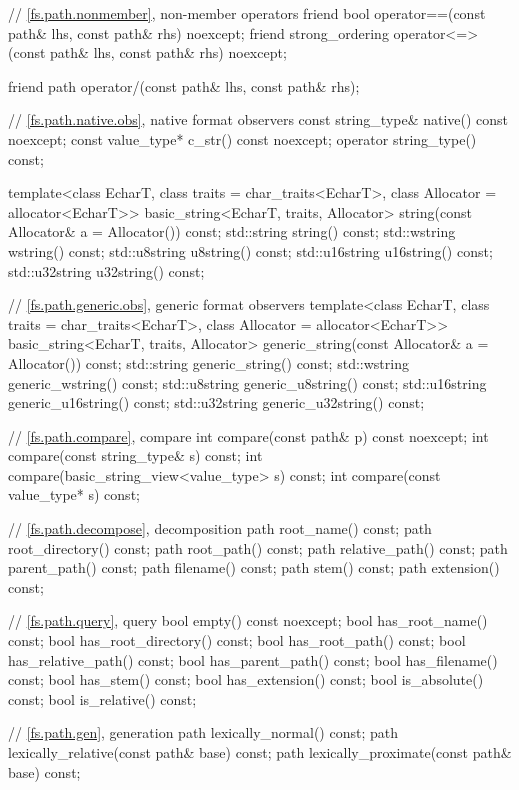 \begin{codeblock}
{{    // \ref{fs.path.nonmember}, non-member operators
    friend bool operator==(const path& lhs, const path& rhs) noexcept;
    friend strong_ordering operator<=>(const path& lhs, const path& rhs) noexcept;

    friend path operator/(const path& lhs, const path& rhs);

    // \ref{fs.path.native.obs}, native format observers
    const string_type& native() const noexcept;
    const value_type*  c_str() const noexcept;
    operator string_type() const;

    template<class EcharT, class traits = char_traits<EcharT>,
             class Allocator = allocator<EcharT>>
      basic_string<EcharT, traits, Allocator>
        string(const Allocator& a = Allocator()) const;
    std::string    string() const;
    std::wstring   wstring() const;
    std::u8string  u8string() const;
    std::u16string u16string() const;
    std::u32string u32string() const;

    // \ref{fs.path.generic.obs}, generic format observers
    template<class EcharT, class traits = char_traits<EcharT>,
             class Allocator = allocator<EcharT>>
      basic_string<EcharT, traits, Allocator>
        generic_string(const Allocator& a = Allocator()) const;
    std::string    generic_string() const;
    std::wstring   generic_wstring() const;
    std::u8string  generic_u8string() const;
    std::u16string generic_u16string() const;
    std::u32string generic_u32string() const;

    // \ref{fs.path.compare}, compare
    int compare(const path& p) const noexcept;
    int compare(const string_type& s) const;
    int compare(basic_string_view<value_type> s) const;
    int compare(const value_type* s) const;

    // \ref{fs.path.decompose}, decomposition
    path root_name() const;
    path root_directory() const;
    path root_path() const;
    path relative_path() const;
    path parent_path() const;
    path filename() const;
    path stem() const;
    path extension() const;

    // \ref{fs.path.query}, query
    bool empty() const noexcept;
    bool has_root_name() const;
    bool has_root_directory() const;
    bool has_root_path() const;
    bool has_relative_path() const;
    bool has_parent_path() const;
    bool has_filename() const;
    bool has_stem() const;
    bool has_extension() const;
    bool is_absolute() const;
    bool is_relative() const;

    // \ref{fs.path.gen}, generation
    path lexically_normal() const;
    path lexically_relative(const path& base) const;
    path lexically_proximate(const path& base) const;

}}
\end{codeblock}
